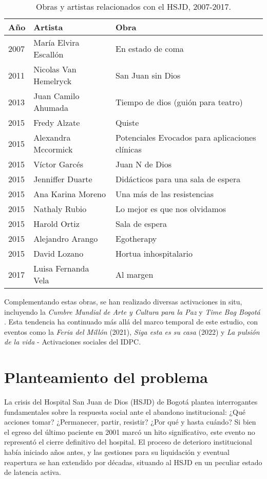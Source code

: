 \begin{table}[htbp]
\centering
\begin{tabular}{|l|l|l|}
\hline
\textbf{Año} & \textbf{Artista} & \textbf{Obra} \\ \hline
2007 & María Elvira Escallón & En estado de coma \\ \hline
2011 & Nicolas Van Hemelryck & San Juan sin Dios \\ \hline
2013 & Juan Camilo Ahumada & Tiempo de dios (guión para teatro) \\ \hline
2015 & Fredy Alzate & Quiste \\ \hline
2015 & Alexandra Mccormick & Potenciales Evocados para aplicaciones clínicas \\ \hline
2015 & Víctor Garcés & Juan N de Dios \\ \hline
2015 & Jenniffer Duarte & Didácticos para una sala de espera \\ \hline
2015 & Ana Karina Moreno & Una más de las resistencias \\ \hline
2015 & Nathaly Rubio & Lo mejor es que nos olvidamos \\ \hline
2015 & Harold Ortiz & Sala de espera \\ \hline
2015 & Alejandro Arango & Egotherapy \\ \hline
2015 & David Lozano & Hortua inhospitalario \\ \hline
2017 & Luisa Fernanda Vela & Al margen \\ \hline
\end{tabular}
\caption{Obras y artistas relacionados con el HSJD, 2007-2017.}
\label{tabla:obras_artistas}
\end{table}

Complementando estas obras, se han realizado diversas activaciones in situ, incluyendo la \textit{Cumbre Mundial de Arte y Cultura para la Paz} y \textit{Time Bag Bogotá} \parencite{IDARTES2015}. Esta tendencia ha continuado más allá del marco temporal de este estudio, con eventos como la \textit{Feria del Millón} (2021), \textit{Siga esta es su casa} (2022) y \textit{La pulsión de la vida} - Activaciones sociales del IDPC.

\section*{Planteamiento del problema}

La crisis del Hospital San Juan de Dios (HSJD) de Bogotá plantea interrogantes fundamentales sobre la respuesta social ante el abandono institucional: ¿Qué acciones tomar? ¿Permanecer, partir, resistir? ¿Por qué y hasta cuándo? Si bien el egreso del último paciente en 2001 marcó un hito significativo, este evento no representó el cierre definitivo del hospital. El proceso de deterioro institucional había iniciado años antes, y las gestiones para su liquidación y eventual reapertura se han extendido por décadas, situando al HSJD en un peculiar estado de latencia activa.

